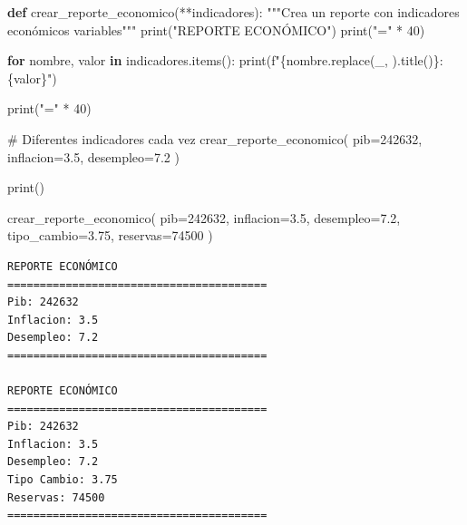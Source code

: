 \documentclass[
  doc,
  floatsintext,
  longtable,
  a4paper,
  nolmodern,
  notxfonts,
  notimes,
  12pt,
  colorlinks=true,linkcolor=blue,citecolor=blue,urlcolor=blue]{apa7}
\newenvironment{Shaded}{\begin{snugshade}}{\end{snugshade}}
\newcommand{\BuiltInTok}[1]{\textcolor[rgb]{0.00,0.23,0.31}{#1}}
\newcommand{\CommentTok}[1]{\textcolor[rgb]{0.37,0.37,0.37}{#1}}
\newcommand{\ControlFlowTok}[1]{\textcolor[rgb]{0.00,0.23,0.31}{\textbf{#1}}}
\newcommand{\DecValTok}[1]{\textcolor[rgb]{0.68,0.00,0.00}{#1}}
\newcommand{\FloatTok}[1]{\textcolor[rgb]{0.68,0.00,0.00}{#1}}
\newcommand{\KeywordTok}[1]{\textcolor[rgb]{0.00,0.23,0.31}{\textbf{#1}}}
\newcommand{\NormalTok}[1]{\textcolor[rgb]{0.00,0.23,0.31}{#1}}
\newcommand{\OperatorTok}[1]{\textcolor[rgb]{0.37,0.37,0.37}{#1}}
\newcommand{\SpecialCharTok}[1]{\textcolor[rgb]{0.37,0.37,0.37}{#1}}
\newcommand{\SpecialStringTok}[1]{\textcolor[rgb]{0.13,0.47,0.30}{#1}}
\newcommand{\StringTok}[1]{\textcolor[rgb]{0.13,0.47,0.30}{#1}}
\begin{document}
\begin{Shaded}
\begin{Highlighting}[]
\KeywordTok{def}\NormalTok{ crear\_reporte\_economico(}\OperatorTok{**}\NormalTok{indicadores):}
    \CommentTok{"""Crea un reporte con indicadores económicos variables"""}
    \BuiltInTok{print}\NormalTok{(}\StringTok{"REPORTE ECONÓMICO"}\NormalTok{)}
    \BuiltInTok{print}\NormalTok{(}\StringTok{"="} \OperatorTok{*} \DecValTok{40}\NormalTok{)}
    
    \ControlFlowTok{for}\NormalTok{ nombre, valor }\KeywordTok{in}\NormalTok{ indicadores.items():}
        \BuiltInTok{print}\NormalTok{(}\SpecialStringTok{f"}\SpecialCharTok{\{}\NormalTok{nombre}\SpecialCharTok{.}\NormalTok{replace(}\StringTok{\textquotesingle{}\_\textquotesingle{}}\NormalTok{, }\StringTok{\textquotesingle{} \textquotesingle{}}\NormalTok{)}\SpecialCharTok{.}\NormalTok{title()}\SpecialCharTok{\}}\SpecialStringTok{: }\SpecialCharTok{\{}\NormalTok{valor}\SpecialCharTok{\}}\SpecialStringTok{"}\NormalTok{)}
    
    \BuiltInTok{print}\NormalTok{(}\StringTok{"="} \OperatorTok{*} \DecValTok{40}\NormalTok{)}

\CommentTok{\# Diferentes indicadores cada vez}
\NormalTok{crear\_reporte\_economico(}
\NormalTok{    pib}\OperatorTok{=}\DecValTok{242632}\NormalTok{,}
\NormalTok{    inflacion}\OperatorTok{=}\FloatTok{3.5}\NormalTok{,}
\NormalTok{    desempleo}\OperatorTok{=}\FloatTok{7.2}
\NormalTok{)}

\BuiltInTok{print}\NormalTok{()}

\NormalTok{crear\_reporte\_economico(}
\NormalTok{    pib}\OperatorTok{=}\DecValTok{242632}\NormalTok{,}
\NormalTok{    inflacion}\OperatorTok{=}\FloatTok{3.5}\NormalTok{,}
\NormalTok{    desempleo}\OperatorTok{=}\FloatTok{7.2}\NormalTok{,}
\NormalTok{    tipo\_cambio}\OperatorTok{=}\FloatTok{3.75}\NormalTok{,}
\NormalTok{    reservas}\OperatorTok{=}\DecValTok{74500}
\NormalTok{)}
\end{Highlighting}
\end{Shaded}

\begin{verbatim}
REPORTE ECONÓMICO
========================================
Pib: 242632
Inflacion: 3.5
Desempleo: 7.2
========================================

REPORTE ECONÓMICO
========================================
Pib: 242632
Inflacion: 3.5
Desempleo: 7.2
Tipo Cambio: 3.75
Reservas: 74500
========================================
\end{verbatim}
\end{document}
